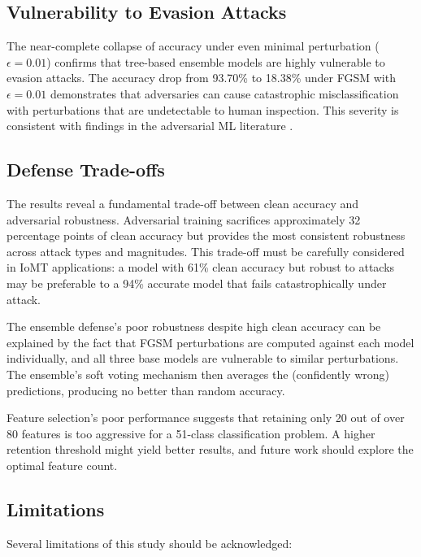 \documentclass[12pt,a4paper,oneside]{report}
\begin{document}
\subsection{Vulnerability to Evasion Attacks}

The near-complete collapse of accuracy under even minimal perturbation ($\epsilon = 0.01$) confirms that tree-based ensemble models are highly vulnerable to evasion attacks. The accuracy drop from 93.70\% to 18.38\% under FGSM with $\epsilon = 0.01$ demonstrates that adversaries can cause catastrophic misclassification with perturbations that are undetectable to human inspection. This severity is consistent with findings in the adversarial ML literature \cite{goodfellow2015explaining, papernot2016limitations}.

\subsection{Defense Trade-offs}

The results reveal a fundamental trade-off between clean accuracy and adversarial robustness. Adversarial training sacrifices approximately 32 percentage points of clean accuracy but provides the most consistent robustness across attack types and magnitudes. This trade-off must be carefully considered in IoMT applications: a model with 61\% clean accuracy but robust to attacks may be preferable to a 94\% accurate model that fails catastrophically under attack.

The ensemble defense's poor robustness despite high clean accuracy can be explained by the fact that FGSM perturbations are computed against each model individually, and all three base models are vulnerable to similar perturbations. The ensemble's soft voting mechanism then averages the (confidently wrong) predictions, producing no better than random accuracy.

Feature selection's poor performance suggests that retaining only 20 out of over 80 features is too aggressive for a 51-class classification problem. A higher retention threshold might yield better results, and future work should explore the optimal feature count.

\subsection{Limitations}

Several limitations of this study should be acknowledged:
\end{document}
